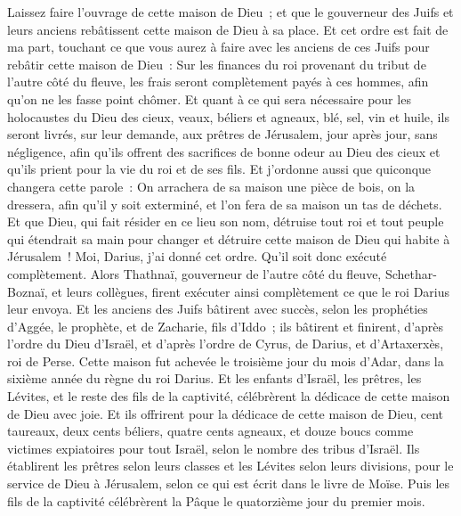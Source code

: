 \begin{multicols}{2}
Laissez faire l'ouvrage de cette maison de Dieu~; et que le gouverneur des Juifs et leurs anciens rebâtissent cette maison de Dieu à sa place.
Et cet ordre est fait de ma part, touchant ce que vous aurez à faire avec les anciens de ces Juifs pour rebâtir cette maison de Dieu~: Sur les finances du roi provenant du tribut de l'autre côté du fleuve, les frais seront complètement payés à ces hommes, afin qu'on ne les fasse point chômer.
Et quant à ce qui sera nécessaire pour les holocaustes du Dieu des cieux, veaux, béliers et agneaux, blé, sel, vin et huile, ils seront livrés, sur leur demande, aux prêtres de Jérusalem, jour après jour, sans négligence,
afin qu'ils offrent des sacrifices de bonne odeur au Dieu des cieux et qu'ils prient pour la vie du roi et de ses fils.
Et j'ordonne aussi que quiconque changera cette parole~: On arrachera de sa maison une pièce de bois, on la dressera, afin qu'il y soit exterminé, et l'on fera de sa maison un tas de déchets.
Et que Dieu, qui fait résider en ce lieu son nom, détruise tout roi et tout peuple qui étendrait sa main pour changer et détruire cette maison de Dieu qui habite à Jérusalem~! Moi, Darius, j'ai donné cet ordre. Qu'il soit donc exécuté complètement.
Alors Thathnaï, gouverneur de l'autre côté du fleuve, Schethar-Boznaï, et leurs collègues, firent exécuter ainsi complètement ce que le roi Darius leur envoya.
Et les anciens des Juifs bâtirent avec succès, selon les prophéties d'Aggée, le prophète, et de Zacharie, fils d'Iddo~; ils bâtirent et finirent, d'après l'ordre du Dieu d'Israël, et d'après l'ordre de Cyrus, de Darius, et d'Artaxerxès, roi de Perse.
Cette maison fut achevée le troisième jour du mois d'Adar, dans la sixième année du règne du roi Darius.
Et les enfants d'Israël, les prêtres, les Lévites, et le reste des fils de la captivité, célébrèrent la dédicace de cette maison de Dieu avec joie.
Et ils offrirent pour la dédicace de cette maison de Dieu, cent taureaux, deux cents béliers, quatre cents agneaux, et douze boucs comme victimes expiatoires pour tout Israël, selon le nombre des tribus d'Israël.
Ils établirent les prêtres selon leurs classes et les Lévites selon leurs divisions, pour le service de Dieu à Jérusalem, selon ce qui est écrit dans le livre de Moïse.
Puis les fils de la captivité célébrèrent la Pâque le quatorzième jour du premier mois.

\end{multicols}

